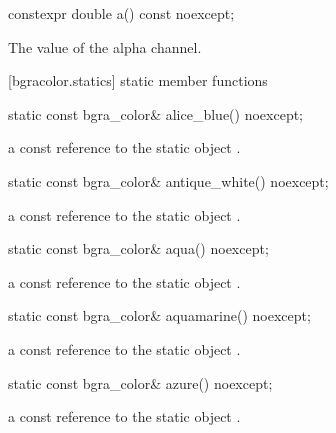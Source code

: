 \begin{itemdecl}
constexpr double a() const noexcept;
\end{itemdecl}
\begin{itemdescr}
\pnum
\returns
The value of the alpha channel.
\end{itemdescr}

 [bgracolor.statics] { static member functions}

\begin{itemdecl}
static const bgra_color& alice_blue() noexcept;
\end{itemdecl}
\begin{itemdescr}
\pnum
\returns
a const reference to the static  object .
\end{itemdescr}

\begin{itemdecl}
static const bgra_color& antique_white() noexcept;
\end{itemdecl}
\begin{itemdescr}
\pnum
\returns
a const reference to the static  object .
\end{itemdescr}

\begin{itemdecl}
static const bgra_color& aqua() noexcept;
\end{itemdecl}
\begin{itemdescr}
\pnum
\returns
a const reference to the static  object .
\end{itemdescr}

\begin{itemdecl}
static const bgra_color& aquamarine() noexcept;
\end{itemdecl}
\begin{itemdescr}
\pnum
\returns
a const reference to the static  object .
\end{itemdescr}

\begin{itemdecl}
static const bgra_color& azure() noexcept;
\end{itemdecl}
\begin{itemdescr}
\pnum
\returns
a const reference to the static  object .
\end{itemdescr}

